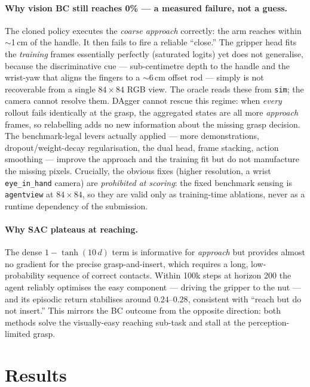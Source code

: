 \documentclass[10pt]{article}
\newcommand{\code}[1]{\texttt{\small #1}}
\begin{document}
\paragraph{Why vision BC still reaches 0\% --- a measured failure, not a guess.}
The cloned policy executes the \emph{coarse approach} correctly: the arm reaches
within $\sim$1\,cm of the handle. It then fails to fire a reliable ``close.'' The
gripper head fits the \emph{training} frames essentially perfectly (saturated
logits) yet does not generalise, because the discriminative cue --- sub-centimetre
depth to the handle and the wrist-yaw that aligns the fingers to a $\sim$6\,cm
offset rod --- simply is not recoverable from a single $84{\times}84$ RGB view. The
oracle reads these from \code{sim}; the camera cannot resolve them. DAgger cannot
rescue this regime: when \emph{every} rollout fails identically at the grasp, the
aggregated states are all more \emph{approach} frames, so relabelling adds no new
information about the missing grasp decision. The benchmark-legal levers actually
applied --- more demonstrations, dropout/weight-decay regularisation, the dual head,
frame stacking, action smoothing --- improve the approach and the training fit but
do not manufacture the missing pixels. Crucially, the obvious fixes (higher
resolution, a wrist \code{eye\_in\_hand} camera) are \emph{prohibited at scoring}:
the fixed benchmark sensing is \code{agentview} at $84{\times}84$, so they are valid
only as training-time ablations, never as a runtime dependency of the submission.

\paragraph{Why SAC plateaus at reaching.} The dense
$1-\tanh(10\,d)$ term is informative for \emph{approach} but provides almost no
gradient for the precise grasp-and-insert, which requires a long, low-probability
sequence of correct contacts. Within 100k steps at horizon 200 the agent reliably
optimises the easy component --- driving the gripper to the nut --- and its episodic
return stabilises around $0.24$--$0.28$, consistent with ``reach but do not insert.''
This mirrors the BC outcome from the opposite direction: both methods solve the
visually-easy reaching sub-task and stall at the perception-limited grasp.

\section{Results}
\end{document}
